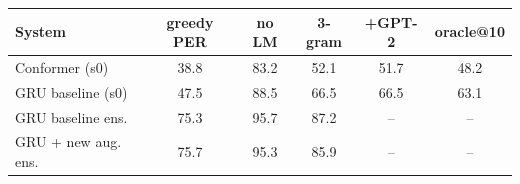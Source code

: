 \begin{tabular}{lccccc}
\toprule
System & greedy PER & no LM & 3-gram & +GPT-2 & oracle@10 \\
\midrule
Conformer (s0) & 38.8 & 83.2 & 52.1 & 51.7 & 48.2 \\
GRU baseline (s0) & 47.5 & 88.5 & 66.5 & 66.5 & 63.1 \\
GRU baseline ens. & 75.3 & 95.7 & 87.2 & -- & -- \\
GRU + new aug. ens. & 75.7 & 95.3 & 85.9 & -- & -- \\
\bottomrule
\end{tabular}